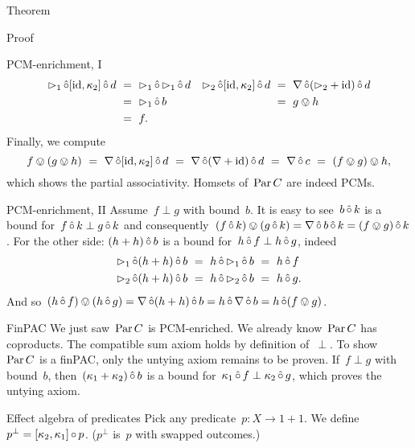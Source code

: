\documentclass[b]{subfiles}
\begin{document}
\begin{parsec}
\begin{point}{Theorem}
\begin{point}{Proof}
\begin{point}{PCM-enrichment, I}
\begin{align*}
    \mathord{\vartriangleright}_1 \mathop{\hat\circ} [\operatorname{id},\kappa_2] \mathop{\hat\circ} d
        & \ = \ \mathord{\vartriangleright}_1 \mathop{\hat\circ} \mathord{\vartriangleright}_1 \mathop{\hat\circ} d
    & \mathord{\vartriangleright}_2 \mathop{\hat\circ} [\operatorname{id},\kappa_2]\mathop{\hat\circ} d & \ =\ \nabla \mathop{\hat\circ} (\mathord{\vartriangleright}_2 + \operatorname{id}) \mathop{\hat\circ} d \\
        & \ = \ \mathord{\vartriangleright}_1 \mathop{\hat\circ} b
        && \ =\  g \ovee h \\
        & \ = \ f.
\end{align*}
Finally,
we compute
\begin{equation*}
f \ovee (g \ovee h)
\ = \ \nabla \mathop{\hat\circ} [\operatorname{id}, \kappa_2] \mathop{\hat\circ} d
\ = \ \nabla \mathop{\hat\circ} (\nabla+ \operatorname{id}) \mathop{\hat\circ} d
\ = \ \nabla \mathop{\hat\circ} c
\ = \ (f \ovee g) \ovee h,
\end{equation*}
which shows the partial associativity.
Homsets of~$\operatorname{Par} C$ are indeed PCMs.
\end{point}
\begin{point}{PCM-enrichment, II}%
Assume~$f \perp g$ with bound~$b$.
It is easy to see~$b \mathop{\hat\circ} k$
    is a bound for~$f \mathop{\hat\circ} k \perp g \mathop{\hat\circ} k$
    and consequently~$(f \mathop{\hat\circ} k) \ovee (g \mathop{\hat\circ} k)
                = \nabla \mathop{\hat\circ} b \mathop{\hat\circ} k = 
                (f \ovee g) \mathop{\hat\circ} k$.
For the other side:
$(h + h) \mathop{\hat\circ} b$ is a bound for~$h \mathop{\hat\circ} f \perp h \mathop{\hat\circ} g$,
    indeed
\begin{align*}
    \pproj_1 \hafter (h+h) \hafter b
    &\ = \ 
    h\hafter \pproj_1 \hafter b \ =\  h \hafter f \\
    \pproj_2 \hafter (h+h) \hafter b
    &\ = \ 
    h\hafter \pproj_2 \hafter b\  =\  h \hafter g.
\end{align*}
And so~$(h \mathop{\hat\circ} f) \ovee (h \mathop{\hat\circ} g)
            = \nabla \mathop{\hat\circ} (h+h) \mathop{\hat\circ} b
            = h \mathop{\hat\circ} \nabla \mathop{\hat\circ} b = h \mathop{\hat\circ} (f \ovee g)$.
\end{point}
\begin{point}{FinPAC}%
We just saw~$\operatorname{Par} C$ is PCM-enriched.
We already know~$\operatorname{Par} C$ has coproducts.
The compatible sum axiom holds by definition of~$\perp$.
To show~$\operatorname{Par} C$ is a finPAC, only the untying axiom remains to be proven.
If~$f \perp g$ with bound~$b$,
then~$(\kappa_1 + \kappa_2) \mathop{\hat\circ} b$ is a bound for~$\kappa_1 \mathop{\hat\circ} f
    \perp \kappa_2 \mathop{\hat\circ} g$,
    which proves the untying axiom.
\end{point}
\begin{point}{Effect algebra of predicates}%
Pick any predicate~$p \colon X \to 1+1$.
We define~$p^\perp = [\kappa_2,\kappa_1]\mathop{\circ} p$.
($p^\perp$ is~$p$ with swapped outcomes.)

\end{point}
\end{point}
\end{point}
\end{parsec}
\end{document}
